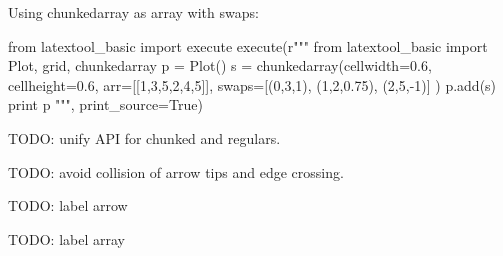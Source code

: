 Using chunkedarray as array with swaps:
\begin{python}
from latextool_basic import execute
execute(r"""
from latextool_basic import Plot, grid, chunkedarray
p = Plot()
s = chunkedarray(cellwidth=0.6,
                 cellheight=0.6,
                 arr=[[1,3,5,2,4,5]],
                 swaps=[(0,3,1), (1,2,0.75), (2,5,-1)]
)
p.add(s)
print p
""", print_source=True)
\end{python}


TODO: unify API for chunked and regulars.

TODO: avoid collision of arrow tips and edge crossing.

TODO: label arrow

TODO: label array
